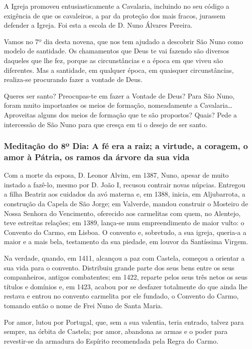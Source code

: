 \documentclass[a4paper,14pt]{extarticle} \usepackage[utf8]{inputenc}
\begin{document}
A Igreja promoveu entusiasticamente a Cavalaria, incluindo no seu código a exigência de que os cavaleiros, a par da proteção dos mais fracos, jurassem defender a Igreja. Foi esta a escola de D. Nuno Álvares Pereira.

Vamos no 7º dia desta novena, que nos tem ajudado a descobrir São Nuno como modelo de santidade. Os chamamentos que Deus te vai fazendo são diversos daqueles que lhe fez, porque as circunstâncias e a época em que viveu são diferentes. Mas a santidade, em qualquer época, em quaisquer circunstâncias, realiza-se procurando fazer a vontade de Deus.

Queres ser santo? Preocupas-te em fazer a Vontade de Deus? Para São Nuno, foram muito importantes os meios de formação, nomeadamente a Cavalaria… Aproveitas alguns dos meios de formação que te são propostos? Quais? Pede a intercessão de São Nuno para que cresça em ti o desejo de ser santo.


\subsubsection{Meditação do 8º Dia: A fé era a raiz; a virtude, a coragem, o amor à Pátria, os ramos da árvore da sua vida}

Com a morte da esposa, D. Leonor Alvim, em 1387, Nuno, apesar de muito instado a fazê-lo, mesmo por D. João I, recusou contrair novas núpcias. Entregou a filha Beatriz aos cuidados da avó materna e, em 1388, inicia, em Aljubarrota, a construção da Capela de São Jorge; em Valverde, mandou construir o Mosteiro de Nossa Senhora do Vencimento, oferecido aos carmelitas com quem, no Alentejo, teve estreitas relações; em 1389, lança-se num empreendimento de maior vulto: o Convento do Carmo, em Lisboa. O convento e, sobretudo, a sua igreja, queria-a a maior e a mais bela, testamento da sua piedade, em louvor da Santíssima Virgem.

Na verdade, quando, em 1411, alcançou a paz com Castela, começou a orientar a sua vida para o convento. Distribuiu grande parte dos seus bens entre os seus companheiros, antigos combatentes; em 1422, reparte pelos seus três netos os seus títulos e domínios e, em 1423, acabou por se desfazer totalmente do que ainda lhe restava e entrou no convento carmelita por ele fundado, o Convento do Carmo, tomando então o nome de Frei Nuno de Santa Maria.

Por amor, lutou por Portugal, que, sem a sua valentia, teria entrado, talvez para sempre, na órbita de Castela; por amor, abandona as armas e o poder para revestir-se da armadura do Espírito recomendada pela Regra do Carmo.
\end{document}
